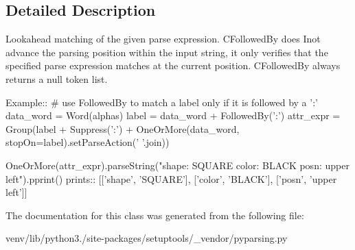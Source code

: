\subsection{Detailed Description}
\begin{DoxyVerb}Lookahead matching of the given parse expression.  C{FollowedBy}
does I{not} advance the parsing position within the input string, it only
verifies that the specified parse expression matches at the current
position.  C{FollowedBy} always returns a null token list.

Example::
    # use FollowedBy to match a label only if it is followed by a ':'
    data_word = Word(alphas)
    label = data_word + FollowedBy(':')
    attr_expr = Group(label + Suppress(':') + OneOrMore(data_word, stopOn=label).setParseAction(' '.join))
    
    OneOrMore(attr_expr).parseString("shape: SQUARE color: BLACK posn: upper left").pprint()
prints::
    [['shape', 'SQUARE'], ['color', 'BLACK'], ['posn', 'upper left']]
\end{DoxyVerb}
 

The documentation for this class was generated from the following file\+:\begin{DoxyCompactItemize}
\item 
venv/lib/python3./site-\/packages/setuptools/\+\_\+vendor/pyparsing.\+py\end{DoxyCompactItemize}
